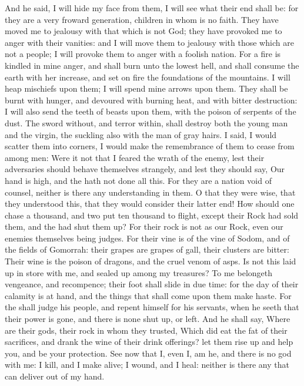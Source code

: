 \begin{biblechapter}
\verse And he said, I will hide my face from them, I will see what their end shall be: for they are a very froward generation, children in whom is no faith.
\verse They have moved me to jealousy with that which is not God; they have provoked me to anger with their vanities: and I will move them to jealousy with those which are not a people; I will provoke them to anger with a foolish nation.
\verse For a fire is kindled in mine anger, and shall burn unto the lowest hell, and shall consume the earth with her increase, and set on fire the foundations of the mountains.
\verse I will heap mischiefs upon them; I will spend mine arrows upon them.
\verse They shall be burnt with hunger, and devoured with burning heat, and with bitter destruction: I will also send the teeth of beasts upon them, with the poison of serpents of the dust.
\verse The sword without, and terror within, shall destroy both the young man and the virgin, the suckling also with the man of gray hairs.
\verse I said, I would scatter them into corners, I would make the remembrance of them to cease from among men:
\verse Were it not that I feared the wrath of the enemy, lest their adversaries should behave themselves strangely, and lest they should say, Our hand is high, and the \LORD hath not done all this.
\verse For they are a nation void of counsel, neither is there any understanding in them.
\verse O that they were wise, that they understood this, that they would consider their latter end!
\verse How should one chase a thousand, and two put ten thousand to flight, except their Rock had sold them, and the \LORD had shut them up?
\verse For their rock is not as our Rock, even our enemies themselves being judges.
\verse For their vine is of the vine of Sodom, and of the fields of Gomorrah: their grapes are grapes of gall, their clusters are bitter:
\verse Their wine is the poison of dragons, and the cruel venom of asps.
\verse Is not this laid up in store with me, and sealed up among my treasures?
\verse To me belongeth vengeance, and recompence; their foot shall slide in due time: for the day of their calamity is at hand, and the things that shall come upon them make haste.
\verse For the \LORD shall judge his people, and repent himself for his servants, when he seeth that their power is gone, and there is none shut up, or left.
\verse And he shall say, Where are their gods, their rock in whom they trusted,
\verse Which did eat the fat of their sacrifices, and drank the wine of their drink offerings? let them rise up and help you, and be your protection.
\verse See now that I, even I, am he, and there is no god with me: I kill, and I make alive; I wound, and I heal: neither is there any that can deliver out of my hand.

\end{biblechapter}
